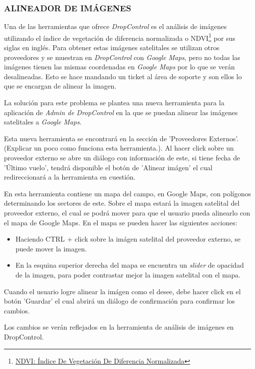 \subsubsection{ALINEADOR DE IMÁGENES}

Una de las herramientas que ofrece \textit{DropControl} es el análisis de imágenes utilizando
el índice de vegetación de diferencia normalizada o NDVI\footnote{\href{https://eos.com/es/make-an-analysis/ndvi/}{NDVI: Índice De Vegetación De Diferencia Normalizada}} por sus siglas en inglés. Para obtener estas imágenes satelitales
se utilizan otros proveedores y se muestran en \textit{DropControl} con \textit{Google Maps}, pero no todas las imágenes tienen
las mismas coordenadas en \textit{Google Maps} por lo que se verán desalineadas. Esto se hace mandando un ticket al área de soporte
y son ellos lo que se encargan de alinear la imagen.

La solución para este problema se plantea una nueva herramienta para la aplicación de \textit{Admin de DropControl} en la que
se puedan alinear las imágenes satelitales a \textit{Google Maps}.

Esta nueva herramienta se encontrará en la sección de 'Proveedores Externos'. (Explicar un poco como funciona esta herramienta.). Al hacer click sobre un proveedor externo se abre un diálogo con información de este, si tiene fecha de 'Último vuelo', tendrá disponible el botón de 'Alinear imágen' el cual redireccionará a la herramienta en cuestión.

En esta herramienta contiene un mapa del campo, en Google Maps, con polígonos determinando los sectores de este. Sobre el mapa estará la imagen satelital del proveedor externo, el cual se podrá mover para que el usuario pueda alinearlo con el mapa de Google Maps.
En el mapa se pueden hacer las siguientes acciones:
\begin{itemize}
    \item Haciendo CTRL + click sobre la imágen satelital del proveedor externo, se puede mover la imagen.
    \item En la esquina superior derecha del mapa se encuentra un \textit{slider} de opacidad de la imagen, para poder contrastar mejor la imagen satelital con el mapa.
\end{itemize}

Cuando el usuario logre alinear la imágen como el desee, debe hacer click en el botón 'Guardar' el cual abrirá un diálogo de confirmación para confirmar los cambios.

Los cambios se verán reflejados en la herramienta de análisis de imágenes en DropControl.
\fi
